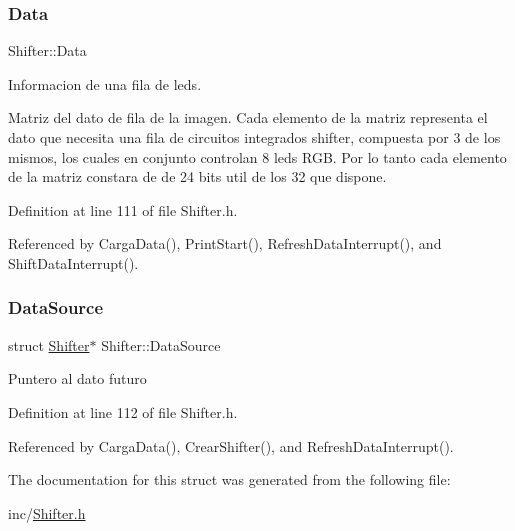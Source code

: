 \subsubsection{\texorpdfstring{Data}{Data}}
{\footnotesize\ttfamily Shifter\+::\+Data}



Informacion de una fila de leds. 

Matriz del dato de fila de la imagen. Cada elemento de la matriz representa el dato que necesita una fila de circuitos integrados shifter, compuesta por 3 de los mismos, los cuales en conjunto controlan 8 leds R\+GB. Por lo tanto cada elemento de la matriz constara de de 24 bits util de los 32 que dispone. 

Definition at line 111 of file Shifter.\+h.



Referenced by Carga\+Data(), Print\+Start(), Refresh\+Data\+Interrupt(), and Shift\+Data\+Interrupt().

\mbox{\label{structShifter_a7c2c0de3d2c63e31863ed44845d63ba8}} 
\subsubsection{\texorpdfstring{Data\+Source}{DataSource}}
{\footnotesize\ttfamily struct \hyperlink{structShifter}{Shifter}$\ast$ Shifter\+::\+Data\+Source}

Puntero al dato futuro 

Definition at line 112 of file Shifter.\+h.



Referenced by Carga\+Data(), Crear\+Shifter(), and Refresh\+Data\+Interrupt().



The documentation for this struct was generated from the following file\+:\begin{DoxyCompactItemize}
\item 
inc/\hyperlink{Shifter_8h}{Shifter.\+h}\end{DoxyCompactItemize}
